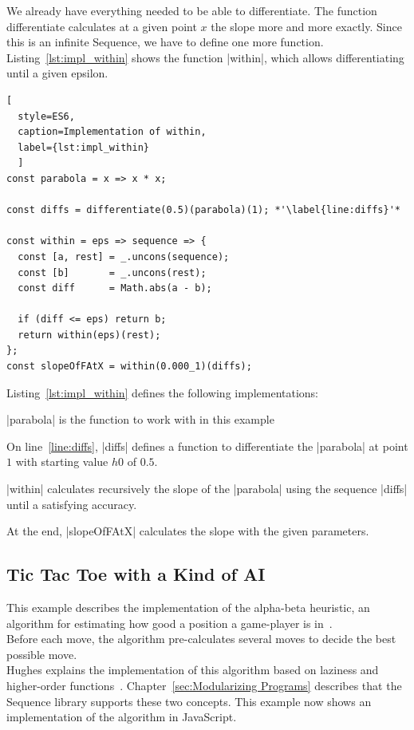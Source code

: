 We already have everything needed to be able to differentiate.  The function
differentiate calculates at a given point $x$ the slope more and more exactly.
Since this is an infinite Sequence, we have to define one more function.
Listing~\ref{lst:impl_within} shows the function |within|, which allows differentiating until a
given epsilon.

\begin{lstlisting}[
  style=ES6, 
  caption=Implementation of within,
  label={lst:impl_within}
  ]
const parabola = x => x * x;

const diffs = differentiate(0.5)(parabola)(1); *'\label{line:diffs}'*

const within = eps => sequence => {
  const [a, rest] = _.uncons(sequence);
  const [b]       = _.uncons(rest);
  const diff      = Math.abs(a - b);

  if (diff <= eps) return b;
  return within(eps)(rest);
};
const slopeOfFAtX = within(0.000_1)(diffs);
\end{lstlisting}

Listing~\ref{lst:impl_within} defines the following implementations:

\begin{itemize}
  \item{|parabola| is the function to work with in this example}
  \item{On line~\ref{line:diffs}, |diffs| defines a function to differentiate the |parabola| at point $1$ with
    starting value $h0$ of $0.5$.}
  \item{|within| calculates recursively the slope of the |parabola| using the
      sequence |diffs| until a satisfying accuracy. 
    \item{ At the end, |slopeOfFAtX| calculates the slope with the given parameters. }
    }
\end{itemize}


\subsection{Tic Tac Toe with a Kind of AI}
\label{sub:Alpha - Beta Algorithm}
This example describes the implementation of the alpha-beta heuristic, an
algorithm for estimating how good a position a game-player is in~\cite[p.
16]{hughes_why_1989}. \\ 
Before each move, the algorithm pre-calculates several moves to decide the best
possible move. \\ 
Hughes explains the implementation of this algorithm based on laziness and
higher-order functions~\cite[p. 16]{hughes_why_1989}.
Chapter~\ref{sec:Modularizing Programs} describes that the Sequence library
supports these two concepts. This example now shows an implementation of the
algorithm in JavaScript.

